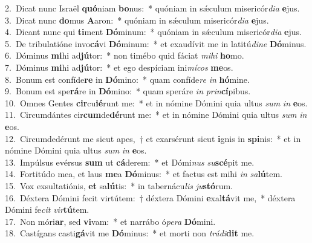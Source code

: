 {2.~}Dicat nunc Israël \textbf{quó}niam \textbf{bo}nus:~* quóniam in sǽculum misericór\textit{di}\textit{a} \textbf{e}jus.\\
{3.~}Dicat nunc \textbf{do}mus \textbf{A}aron:~* quóniam in sǽculum misericór\textit{di}\textit{a} \textbf{e}jus.\\
{4.~}Dicant nunc qui \textbf{ti}ment \textbf{Dó}minum:~* quóniam in sǽculum misericór\textit{di}\textit{a} \textbf{e}jus.\\
{5.~}De tribulatióne invo\textbf{cá}vi \textbf{Dó}minum:~* et exaudívit me in latitú\textit{di}\textit{ne} \textbf{Dó}minus.\\
{6.~}Dóminus \textbf{mi}hi ad\textbf{jú}tor:~* non timébo quid fáciat \textit{mi}\textit{hi} \textbf{ho}mo.\\
{7.~}Dóminus \textbf{mi}hi ad\textbf{jú}tor:~* et ego despíciam ini\textit{mí}\textit{cos} \textbf{me}os.\\
{8.~}Bonum est confíde\textbf{re} in \textbf{Dó}mino:~* quam confíde\textit{re} \textit{in} \textbf{hó}mine.\\
{9.~}Bonum est spe\textbf{rá}re in \textbf{Dó}mino:~* quam speráre \textit{in} \textit{prin}\textbf{cí}pibus.\\
{10.~}Omnes Gentes \textbf{cir}cu\textbf{ié}runt me:~* et in nómine Dómini quia ultus \textit{sum} \textit{in} \textbf{e}os.\\
{11.~}Circumdántes cir\textbf{cum}de\textbf{dé}runt me:~* et in nómine Dómini quia ultus \textit{sum} \textit{in} \textbf{e}os.\\
{12.~}Circumdedérunt me sicut apes,~† et exarsérunt sicut \textbf{i}gnis in \textbf{spi}nis:~* et in nómine Dómini quia ultus \textit{sum} \textit{in} \textbf{e}os.\\
{13.~}Impúlsus evérsus \textbf{sum} ut \textbf{cá}derem:~* et Dómi\textit{nus} \textit{su}\textbf{scé}pit me.\\
{14.~}Fortitúdo mea, et laus \textbf{me}a \textbf{Dó}minus:~* et factus est mihi \textit{in} \textit{sa}\textbf{lú}tem.\\
{15.~}Vox exsultatiónis, \textbf{et} sa\textbf{lú}tis:~* in tabernácu\textit{lis} \textit{ju}\textbf{stó}rum.\\
{16.~}Déxtera Dómini fecit virtútem:~† déxtera Dómini \textbf{e}xal\textbf{tá}vit me,~* déxtera Dómini fe\textit{cit} \textit{vir}\textbf{tú}tem.\\
{17.~}Non móri\textbf{ar}, sed \textbf{vi}vam:~* et narrábo ó\textit{pe}\textit{ra} \textbf{Dó}mini.\\
{18.~}Castígans casti\textbf{gá}vit me \textbf{Dó}minus:~* et morti non \textit{trá}\textit{di}\textbf{dit} me.\\
